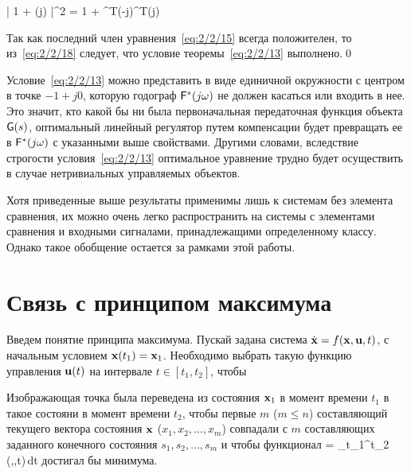     \bigl| 1 + \funcT(j\omega) \bigr|^2 = 1 + ^T(-j\omega)^T\m{\Lambda}(j\omega) 
\eeq

Так как последний член уравнения~\vref{eq:2/2/15} всегда положителен, то из~\ref{eq:2/2/18} следует, что условие теоремы~\ref{eq:2/2/13} выполнено.\qed

Условие~\ref{eq:2/2/13} можно представить в виде единичной окружности с центром в точке $-1 + j0$, которую годограф $\mathsf{F}^{*}(j\omega)$ не должен касаться или входить в нее. Это значит, кто какой бы ни была первоначальная передаточная функция объекта $\mathsf{G}(s)$, оптимальный линейный регулятор путем компенсации будет превращать ее в $\mathsf{F}^{*}(j\omega)$ с указанными выше свойствами. Другими словами, вследствие строгости условия~\vref{eq:2/2/13} оптимальное уравнение трудно будет осуществить в случае нетривиальных управляемых объектов.

\br

Хотя приведенные выше результаты применимы лишь к системам без элемента сравнения, их можно очень легко распространить на системы с элементами сравнения и входными сигналами, принадлежащими определенному классу. Однако такое обобщение остается за рамками этой работы.



\section{Связь с принципом максимума}




Введем понятие принципа максимума. Пускай задана система $\dot{\mathbf{x}} = f(\mathbf{x}, \mathbf{u}, t)$, с начальным условием $\mathbf{x}(t_1) = \mathbf{x}_1$. Необходимо выбрать такую функцию управления $\mathbf{u}(t)$ на интервале $t \in [t_1, t_2]$, чтобы

\benum
	\item
		Изображающая точка была переведена из состояния $\mathbf{x}_1$ в момент времени $t_1$ в такое состояни в момент времени $t_2$, чтобы первые $m$ ($m \leqslant n$) составляющий текущего вектора состояния $\mathbf{x}$ ($x_1, x_2, \ldots, x_m$) совпадали с $m$ составляющих заданного конечного состояния $s_1, s_2, \ldots, s_m$ и чтобы функционал
			\funcF = \int\limits_{t_1}^{t_2} \funcL(,,t)\,dt
		\eeq
		достигал бы минимума.
		
